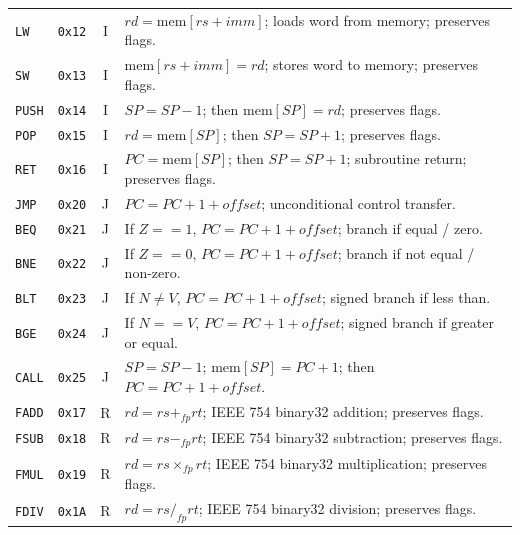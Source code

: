 \documentclass[11pt,a4paper]{article}
\begin{document}
\begin{table}[h]
\begin{tabularx}{\textwidth}{l c c X}
\texttt{LW}   & \texttt{0x12} & I & $rd = \text{mem}[rs + imm]$; loads word from memory; preserves flags. \\
\texttt{SW}   & \texttt{0x13} & I & $\text{mem}[rs + imm] = rd$; stores word to memory; preserves flags. \\
\texttt{PUSH} & \texttt{0x14} & I & $SP = SP - 1$; then $\text{mem}[SP] = rd$; preserves flags. \\
\texttt{POP}  & \texttt{0x15} & I & $rd = \text{mem}[SP]$; then $SP = SP + 1$; preserves flags. \\
\texttt{RET}  & \texttt{0x16} & I & $PC = \text{mem}[SP]$; then $SP = SP + 1$; subroutine return; preserves flags. \\
\texttt{JMP}  & \texttt{0x20} & J & $PC = PC + 1 + offset$; unconditional control transfer. \\
\texttt{BEQ}  & \texttt{0x21} & J & If $Z == 1$, $PC = PC + 1 + offset$; branch if equal / zero. \\
\texttt{BNE}  & \texttt{0x22} & J & If $Z == 0$, $PC = PC + 1 + offset$; branch if not equal / non-zero. \\
\texttt{BLT}  & \texttt{0x23} & J & If $N \neq V$, $PC = PC + 1 + offset$; signed branch if less than. \\
\texttt{BGE}  & \texttt{0x24} & J & If $N == V$, $PC = PC + 1 + offset$; signed branch if greater or equal. \\
\texttt{CALL} & \texttt{0x25} & J & $SP = SP - 1$; $\text{mem}[SP] = PC + 1$; then $PC = PC + 1 + offset$. \\
\texttt{FADD} & \texttt{0x17} & R & $rd = rs +_{fp} rt$; IEEE 754 binary32 addition; preserves flags. \\
\texttt{FSUB} & \texttt{0x18} & R & $rd = rs -_{fp} rt$; IEEE 754 binary32 subtraction; preserves flags. \\
\texttt{FMUL} & \texttt{0x19} & R & $rd = rs \times_{fp} rt$; IEEE 754 binary32 multiplication; preserves flags. \\
\texttt{FDIV} & \texttt{0x1A} & R & $rd = rs /_{fp} rt$; IEEE 754 binary32 division; preserves flags. \\
\bottomrule
\end{tabularx}
\end{table}
\end{document}
